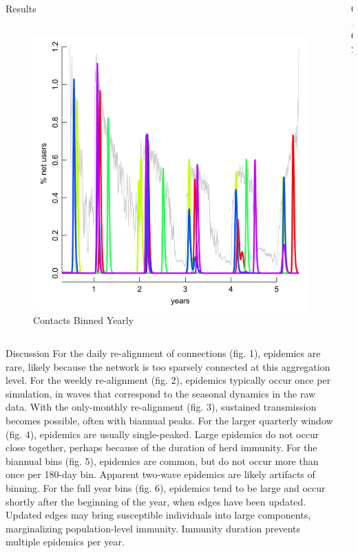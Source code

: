 \documentclass[final]{beamer} %
\newcommand{\spaceProp}{0.02}
\newcommand{\spacer}{\begin{column}{\spaceProp\paperwidth}\end{column}}
\newenvironment{oneCol}{\begin{column}[t]{0.225\paperwidth}}{\end{column}}
\newenvironment{threeCol}{\begin{column}[t]{0.715\paperwidth}}{\end{column}}
\begin{document}
\begin{frame}{}
\begin{columns}[t]
\begin{threeCol}
\begin{block}{Results}
\begin{columns}
\begin{oneCol}
\begin{figure}
      \end{figure}  
      \begin{figure}
        \includegraphics[width=1.0\linewidth]{out365.png}
        \caption{Contacts Binned Yearly}
      \end{figure}  
    \end{oneCol}
    \end{columns}
    \end{block}
    \begin{block}{Discussion}
    For the daily re-alignment of connections (fig. 1), epidemics are rare, likely because the network is too sparsely connected at this aggregation level.  For the weekly re-alignment (fig. 2), epidemics typically occur once per simulation, in waves that correspond to the seasonal dynamics in the raw data.  With the only-monthly re-alignment (fig. 3), sustained transmission becomes possible, often with biannual peaks.  For the larger quarterly window (fig. 4), epidemics are usually single-peaked. Large epidemics do not occur close together, perhaps because of the duration of herd immunity.  For the biannual bins (fig. 5), epidemics are common, but do not occur more than once per 180-day bin. Apparent two-wave epidemics are likely artifacts of binning.  For the full year bins (fig. 6), epidemics tend to be large and occur shortly after the beginning of the year, when edges have been updated. Updated edges may bring susceptible individuals into large components, marginalizing population-level immunity. Immunity duration prevents multiple epidemics per year.
    \end{block}
    \end{threeCol}
    \spacer{}
    \end{columns}
  \end{frame}
  
\end{document}
